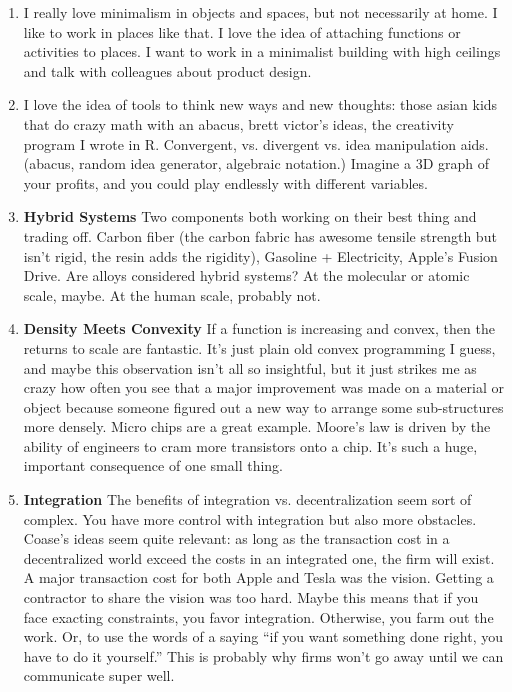 \documentclass[paper=a4, fontsize=11pt]{scrartcl} %
\numberwithin{equation}{section} %
\numberwithin{figure}{section} %
\numberwithin{table}{section} %
\begin{document}
\begin{enumerate}
\item I really love minimalism in objects and spaces, but not necessarily at home.  I like to work in places like that.  I love the idea of attaching functions or activities to places.  I want to work in a minimalist building with high ceilings and talk with colleagues about product design.
\item I love the idea of tools to think new ways and new thoughts:  those asian kids that do crazy math with an abacus, brett victor's ideas, the creativity program I wrote in R.  Convergent, vs. divergent vs. idea manipulation aids. (abacus, random idea generator, algebraic notation.)  Imagine a 3D graph of your profits, and you could play endlessly with different variables.  
\item \textbf{Hybrid Systems} Two components both working on their best thing and trading off.  Carbon fiber (the carbon fabric has awesome tensile strength but isn't rigid, the resin adds the rigidity),  Gasoline + Electricity, Apple's Fusion Drive.  Are alloys considered hybrid systems?  At the molecular or atomic scale, maybe.  At the human scale, probably not.  
\item \textbf{Density Meets Convexity} If a function is increasing and convex, then the returns to scale are fantastic.  It's just plain old convex programming I guess, and maybe this observation isn't all so insightful, but it just strikes me as crazy how often you see that a major improvement was made on a material or object because someone figured out a new way to arrange some sub-structures more densely.  Micro chips are a great example.  Moore's law is driven by the ability of engineers to cram more transistors onto a chip.  It's such a huge, important consequence of one small thing.
\item \textbf{Integration} The benefits of integration vs. decentralization seem sort of complex.  You have more control with integration but also more obstacles.  Coase's ideas seem quite relevant: as long as the transaction cost in a decentralized world exceed the costs in an integrated one, the firm will exist.  A major transaction cost for both Apple and Tesla was the vision.  Getting a contractor to share the vision was too hard.  Maybe this means that if you face exacting constraints, you favor integration.  Otherwise, you farm out the work.  Or, to use the words of a saying ``if you want something done right, you have to do it yourself.''  This is probably why firms won't go away until we can communicate super well.  
\end{enumerate}




\end{document}
